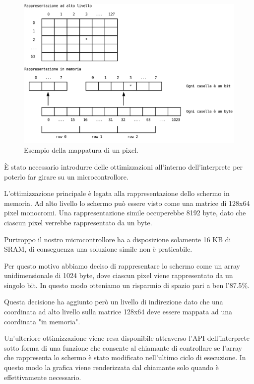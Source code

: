 \documentclass[a4paper]{article}
\begin{document}
\begin{figure}
    \begin{center}
        \includegraphics[scale=0.50]{figures/screenopt.pdf}
    \end{center}
    \caption{Esempio della mappatura di un pixel.}
    \label{fig:screenopt}
\end{figure}

È stato necessario introdurre delle ottimizzazioni all'interno
dell'interprete per poterlo far girare su un microcontrollore.

L'ottimizzazione principale è legata alla rappresentazione dello
schermo in memoria. Ad alto livello lo schermo può essere visto
come una matrice di 128x64 pixel monocromi. Una rappresentazione
simile occuperebbe 8192 byte, dato che ciascun pixel verrebbe
rappresentato da un byte.

Purtroppo il nostro microcontrollore ha a disposizione solamente
16 KB di SRAM, di conseguenza una soluzione simile non è praticabile.

Per questo motivo abbiamo deciso di rappresentare lo schermo come
un array unidimensionale di 1024 byte, dove ciascun pixel viene
rappresentato da un singolo bit. In questo modo otteniamo un
risparmio di spazio pari a ben l'87.5\%.

Questa decisione ha aggiunto però un livello di indirezione dato
che una coordinata ad alto livello sulla matrice 128x64 deve essere
mappata ad una coordinata "in memoria".

Un'ulteriore ottimizzazione viene resa disponibile attraverso l'API
dell'interprete sotto forma di una funzione che consente al chiamante
di controllare se l'array che rappresenta lo schermo è stato
modificato nell'ultimo ciclo di esecuzione. In questo modo la grafica
viene renderizzata dal chiamante solo quando è effettivamente
necessario.
\end{document}

